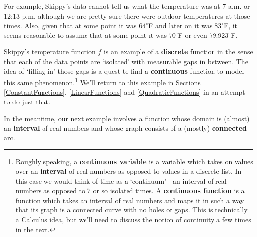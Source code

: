 \documentclass{ximera}
\begin{document}
 

For example, Skippy's data cannot tell us what the temperature was at 7 a.m. or 12:13 p.m, although we are pretty sure there were outdoor temperatures at those times.  Also, given that at some point it was $64^{\circ}$F and later on it was $83^{\circ}$F, it seems reasonable to assume that at some point it was $70^{\circ}$F or even $79.923^{\circ}$F.  

 

Skippy's temperature function $f$ is an example of a  \textbf{discrete} function in the sense that each of the data points are `isolated' with measurable gaps in between.  The idea of `filling in' those gaps is a quest to find a  \textbf{continuous} function to model this same phenomenon.\footnote{Roughly speaking, a \textbf{continuous variable} is a variable which takes on values over an \textbf{interval} of real numbers as opposed to values in a discrete list. In this case we would think of time as a `continuum' - an interval of real numbers as opposed to $7$ or so isolated times.  A \textbf{continuous function} is a function which takes an interval of real numbers and maps it in such a way that its graph is a connected curve with no holes or gaps. This is technically a Calculus idea, but we'll need to discuss the notion of continuity a few times in the text.} We'll return to this example in Sections \ref{ConstantFunctions}, \ref{LinearFunctions} and \ref{QuadraticFunctions} in an attempt to do just that. 

 

In the meantime, our next example involves a function whose domain is (almost) an \textbf{interval} of real numbers and whose graph consists of a (mostly) \textbf{connected} arc.
\end{document}

